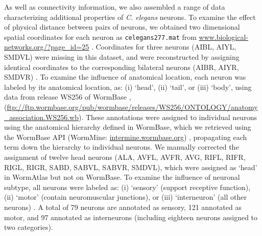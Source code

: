 \documentclass[10pt,letterpaper]{article}
\begin{document}
As well as connectivity information, we also assembled a range of data characterizing additional properties of \emph{C. elegans} neurons.
To examine the effect of physical distance between pairs of neurons, we obtained two dimensional spatial coordinates for each neuron as \texttt{celegans277.mat} from \url{www.biological-networks.org/?page_id=25} \cite{choe2004network}.
Coordinates for three neurons (AIBL, AIYL, SMDVL) were missing in this dataset, and were reconstructed by assigning identical coordinates to the corresponding bilateral neurons (AIBR, AIYR, SMDVR) \cite{Varier2011}.
To examine the influence of anatomical location, each neuron was labeled by its anatomical location, as:
(i) `head', (ii) `tail', or (iii) `body', using data from release WS256 of WormBase \cite{Harris:2009kd}, (\url{ftp://ftp.wormbase.org/pub/wormbase/releases/WS256/ONTOLOGY/anatomy_association.WS256.wb}).
These annotations were assigned to individual neurons using the anatomical hierarchy defined in WormBase, which we retrieved using the WormBase API (WormMine: \url{intermine.wormbase.org}) \cite{Harris:2009kd}, propagating each term down the hierarchy to individual neurons.
We manually corrected the assignment of twelve head neurons (ALA, AVFL, AVFR, AVG, RIFL, RIFR, RIGL, RIGR, SABD, SABVL, SABVR, SMDVL), which were assigned as `head' in WormAtlas \cite{WormAtlas} but not on WormBase.
To examine the influence of neuronal subtype, all neurons were labeled as:
(i) `sensory' (support receptive function),
(ii) `motor' (contain neuromuscular junctions), or
(iii) `interneuron' (all other neurons) \cite{White:1986tx}.
A total of 79 neurons are annotated as sensory, 121 annotated as motor, and 97 annotated as interneurons (including eighteen neurons assigned to two categories).
\end{document}
